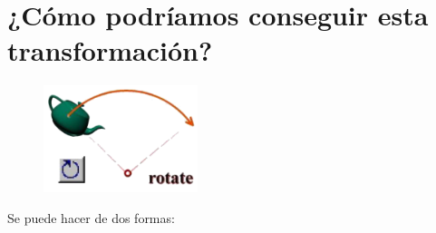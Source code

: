 \documentclass{article}
\begin{document}
 \newpage

\section{¿Cómo podríamos conseguir esta transformación?}

\begin{figure}[H]
   \centering
   \includegraphics[width=0.4\textwidth]{imagenes/tetera.png}
\end{figure}

Se puede hacer de dos formas:
\end{document}
